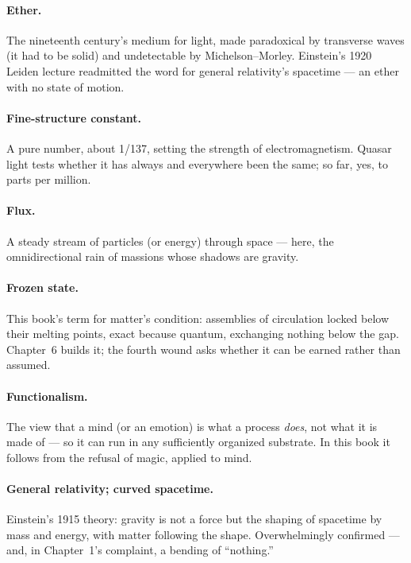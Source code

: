 \documentclass[fontsize=11pt,paper=a4,pagesize=auto,parskip=half-]{scrbook}
\begin{document}
\paragraph{Ether.} The nineteenth century's medium for light, made paradoxical by transverse waves (it had to be solid) and undetectable by Michelson--Morley. Einstein's 1920 Leiden lecture readmitted the word for general relativity's spacetime --- an ether with no state of motion.

\paragraph{Fine-structure constant.} A pure number, about 1/137, setting the strength of electromagnetism. Quasar light tests whether it has always and everywhere been the same; so far, yes, to parts per million.

\paragraph{Flux.} A steady stream of particles (or energy) through space --- here, the omnidirectional rain of massions whose shadows are gravity.

\paragraph{Frozen state.} This book's term for matter's condition: assemblies of circulation locked below their melting points, exact because quantum, exchanging nothing below the gap. Chapter~6 builds it; the fourth wound asks whether it can be earned rather than assumed.

\paragraph{Functionalism.} The view that a mind (or an emotion) is what a process \emph{does}, not what it is made of --- so it can run in any sufficiently organized substrate. In this book it follows from the refusal of magic, applied to mind.

\paragraph{General relativity; curved spacetime.} Einstein's 1915 theory: gravity is not a force but the shaping of spacetime by mass and energy, with matter following the shape. Overwhelmingly confirmed --- and, in Chapter~1's complaint, a bending of ``nothing.''
\end{document}
